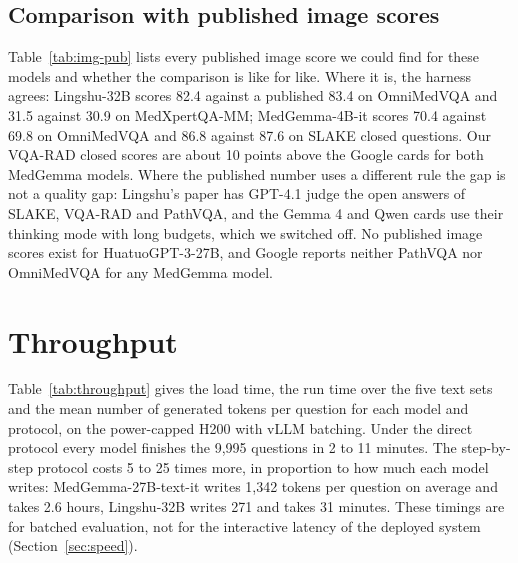 \documentclass{article}
\newcommand{\fit}[1]{\adjustbox{max width=\textwidth}{#1}}
\newcommand{\pct}{\,\%}
\begin{document}
\subsection{Comparison with published image scores}
\label{sec:img-pub}

Table~\ref{tab:img-pub} lists every published image score we could find for these models and whether the comparison is like for like. Where it is, the harness agrees: Lingshu-32B scores 82.4 against a published 83.4 on OmniMedVQA and 31.5 against 30.9 on MedXpertQA-MM; MedGemma-4B-it scores 70.4 against 69.8 on OmniMedVQA and 86.8 against 87.6 on SLAKE closed questions. Our VQA-RAD closed scores are about 10 points above the Google cards for both MedGemma models. Where the published number uses a different rule the gap is not a quality gap: Lingshu's paper has GPT-4.1 judge the open answers of SLAKE, VQA-RAD and PathVQA, and the Gemma 4 and Qwen cards use their thinking mode with long budgets, which we switched off. No published image scores exist for HuatuoGPT-3-27B, and Google reports neither PathVQA nor OmniMedVQA for any MedGemma model.

\begin{table}[htbp]
\centering\footnotesize\setlength{\tabcolsep}{4pt}
\caption{This run against the published image scores, in \pct{}. Diff. = this run minus published, in points. Rows marked No are listed for completeness: the published number uses a different scoring rule.}
\label{tab:img-pub}
\fit{}
\end{table}

\section{Throughput}
\label{sec:throughput}

Table~\ref{tab:throughput} gives the load time, the run time over the five text sets and the mean number of generated tokens per question for each model and protocol, on the power-capped H200 with vLLM batching. Under the direct protocol every model finishes the 9,995 questions in 2 to 11 minutes. The step-by-step protocol costs 5 to 25 times more, in proportion to how much each model writes: MedGemma-27B-text-it writes 1,342 tokens per question on average and takes 2.6 hours, Lingshu-32B writes 271 and takes 31 minutes. These timings are for batched evaluation, not for the interactive latency of the deployed system (Section~\ref{sec:speed}).

\begin{table}[htbp]
\centering\small\setlength{\tabcolsep}{6pt}
\caption{Load and run time over the five text sets (9,995 questions) and mean generated tokens per question, on one H200 at 300\,W.}
\label{tab:throughput}

\end{table}
\end{document}
